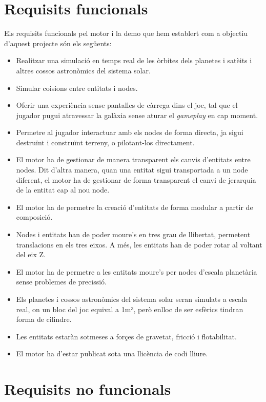 \section{Requisits funcionals}
Els requisits funcionals pel motor i la demo que hem establert com a objectiu d'aquest projecte són els següents:
\begin{itemize}
  \item Realitzar una simulació en temps real de les òrbites dels planetes i satè\lgem its i altres cossos astronòmics del sistema solar. 
  \item Simular co\lgem isions entre entitats i nodes.
  \item Oferir una experiència sense pantalles de càrrega dins el joc, tal que el jugador pugui atravessar la galàxia sense aturar el \textit{gameplay} en cap moment.
  \item Permetre al jugador interactuar amb els nodes de forma directa, ja sigui destruïnt i construïnt terreny, o pilotant-los directament.
  \item El motor ha de gestionar de manera transparent els canvis d'entitats entre nodes. Dit d'altra manera, quan una entitat sigui transportada a un node diferent, el motor ha de gestionar de forma transparent el canvi de jerarquia de la entitat cap al nou node.
  \item El motor ha de permetre la creació d'entitats de forma modular a partir de composició.
  \item Nodes i entitats han de poder moure's en tres grau de llibertat, permetent translacions en els tres eixos. A més, les entitats han de poder rotar al voltant del eix Z.
  \item El motor ha de permetre a les entitats moure's per nodes d'escala planetària sense problemes de precissió.
  \item Els planetes i cossos astronòmics del sistema solar seran simulats a escala real, on un bloc del joc equival a 1m³, però enlloc de ser esfèrics tindran forma de cilindre.
  \item Les entitats estaràn sotmeses a forçes de gravetat, fricció i flotabilitat.
  \item El motor ha d'estar publicat sota una llicència de codi lliure.
\end{itemize}
\section{Requisits no funcionals}
